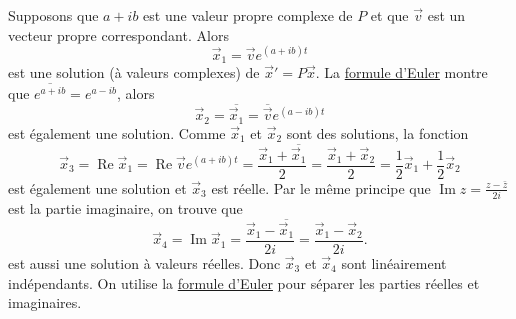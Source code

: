 Supposons que $a + ib$ est une valeur propre complexe de $P$ et que $\vec{v}$
est un vecteur propre correspondant. Alors
\begin{equation*}
\vec{x}_1 = \vec{v} e^{(a+ib)t}
\end{equation*}
est une solution (à valeurs complexes) de
${\vec{x}}' = P \vec{x}$. La \hyperref[eulersformula]{formule d’Euler} montre que
$\overline{e^{a+ib}} =
e^{a-ib}$,
alors
\begin{equation*}
\vec{x}_2 = \overline{\vec{x}_1} = \overline{\vec{v}} e^{(a-ib)t}
\end{equation*}
est également une solution. Comme $\vec{x}_1$ et $\vec{x}_2$ sont des solutions, la fonction
\begin{equation*}
\vec{x}_3 =
\operatorname{Re} \vec{x}_1 =
\operatorname{Re} \vec{v} e^{(a+ib)t} =
\frac{\vec{x}_1 + \overline{\vec{x}_1}}{2}  =
\frac{\vec{x}_1 + \vec{x}_2}{2} 
=
\frac{1}{2} \vec{x}_1 + \frac{1}{2}\vec{x}_2
\end{equation*}
est également une solution et $\vec{x}_3$ est réelle. Par le même principe que
$\operatorname{Im} z = \frac{z-\bar{z}}{2i}$ est la partie imaginaire, on trouve que
\begin{equation*}
\vec{x}_4 =
\operatorname{Im} \vec{x}_1 =
\frac{\vec{x}_1 - \overline{\vec{x}_1}}{2i}  =
\frac{\vec{x}_1 - \vec{x}_2}{2i} .
\end{equation*}
est aussi une solution à valeurs réelles. Donc $\vec{x}_3$ et
$\vec{x}_4$ sont linéairement indépendants. On utilise la \hyperref[eulersformula]{formule d'Euler} pour séparer les parties réelles et imaginaires.

\medskip


